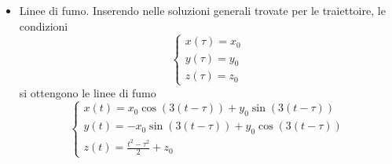 \begin{itemize}
\item Linee di fumo.
Inserendo nelle soluzioni generali trovate per le traiettoire, le condizioni 
\begin{equation}
 \begin{cases}
  x(\tau) = x_0 \\ y(\tau) = y_0 \\ z(\tau) = z_0
 \end{cases}
\end{equation}
si ottengono le linee di fumo
\begin{equation}
\begin{cases}
  x(t) = x_0 \cos(3(t-\tau)) + y_0 \sin(3(t-\tau)) \\
  y(t) = - x_0 \sin(3(t-\tau)) + y_0 \cos(3(t-\tau)) \\
  z(t) = \frac{t^2-\tau^2}{2} + z_0
\end{cases}
\end{equation}



\end{itemize}
